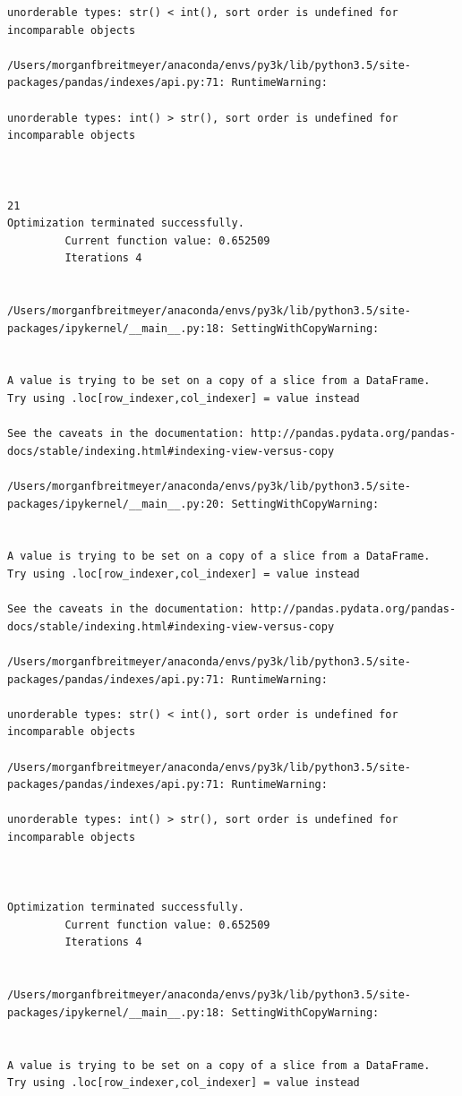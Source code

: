 \begin{lstlisting}
unorderable types: str() < int(), sort order is undefined for incomparable objects

/Users/morganfbreitmeyer/anaconda/envs/py3k/lib/python3.5/site-packages/pandas/indexes/api.py:71: RuntimeWarning:

unorderable types: int() > str(), sort order is undefined for incomparable objects



21
Optimization terminated successfully.
         Current function value: 0.652509
         Iterations 4


/Users/morganfbreitmeyer/anaconda/envs/py3k/lib/python3.5/site-packages/ipykernel/__main__.py:18: SettingWithCopyWarning:


A value is trying to be set on a copy of a slice from a DataFrame.
Try using .loc[row_indexer,col_indexer] = value instead

See the caveats in the documentation: http://pandas.pydata.org/pandas-docs/stable/indexing.html#indexing-view-versus-copy

/Users/morganfbreitmeyer/anaconda/envs/py3k/lib/python3.5/site-packages/ipykernel/__main__.py:20: SettingWithCopyWarning:


A value is trying to be set on a copy of a slice from a DataFrame.
Try using .loc[row_indexer,col_indexer] = value instead

See the caveats in the documentation: http://pandas.pydata.org/pandas-docs/stable/indexing.html#indexing-view-versus-copy

/Users/morganfbreitmeyer/anaconda/envs/py3k/lib/python3.5/site-packages/pandas/indexes/api.py:71: RuntimeWarning:

unorderable types: str() < int(), sort order is undefined for incomparable objects

/Users/morganfbreitmeyer/anaconda/envs/py3k/lib/python3.5/site-packages/pandas/indexes/api.py:71: RuntimeWarning:

unorderable types: int() > str(), sort order is undefined for incomparable objects



Optimization terminated successfully.
         Current function value: 0.652509
         Iterations 4


/Users/morganfbreitmeyer/anaconda/envs/py3k/lib/python3.5/site-packages/ipykernel/__main__.py:18: SettingWithCopyWarning:


A value is trying to be set on a copy of a slice from a DataFrame.
Try using .loc[row_indexer,col_indexer] = value instead


\end{lstlisting}
